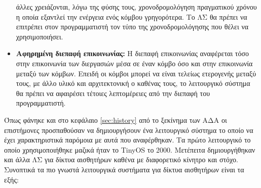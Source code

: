 \begin{itemize}
άλλες χρειάζονται, λόγω της φύσης τους, χρονοδρομολόγηση πραγματικού χρόνου η οποία εξαντλεί την ενέργεια ενός κόμβου γρηγορότερα.
Το ΛΣ θα πρέπει να επιτρέπει στον προγραμματιστή τον τύπο της χρονοδρομολόγησης που θέλει να χρησιμοποιήσει.
\item \textbf{Αφηρημένη διεπαφή επικοινωνίας:} Η διεπαφή επικοινωνίας αναφέρεται τόσο στην επικοινωνία των διεργασιών μέσα σε έναν κόμβο όσο και στην επικοινωνία
μεταξύ των κόμβων.
Επειδή οι κόμβοι μπορεί να είναι τελείως ετερογενής μεταξύ τους, με άλλο υλικό και αρχιτεκτονική ο καθένας τους, το λειτουργικό σύστημα θα πρέπει να αφαιρέσει
τέτοιες λεπτομέρειες από την διεπαφή του προγραμματιστή.
\end{itemize}

Όπως φάνηκε και στο κεφάλαιο \ref{sec:history} από το ξεκίνημα των ΑΔΑ οι επιστήμονες προσπαθούσαν να δημιουργήσουν ένα λειτουργικό σύστημα το οποίο να έχει
χαρακτηριστικά παρόμοια με αυτά που αναφέρθηκαν.
Τα πρώτο λειτουργικό το οποίο χρησιμοποιήθηκε μαζικά ήταν το TinyOS το 2000.
Μετέπειτα δημιουργήθηκαν και άλλα ΛΣ για δίκτυα αισθητήρων καθένα με διαφορετικό κίνητρο και στόχο.
Συνοπτικά τα πιο γνωστά λειτουργικά συστήματα για δίκτυα αισθητήρων είναι τα εξής:

